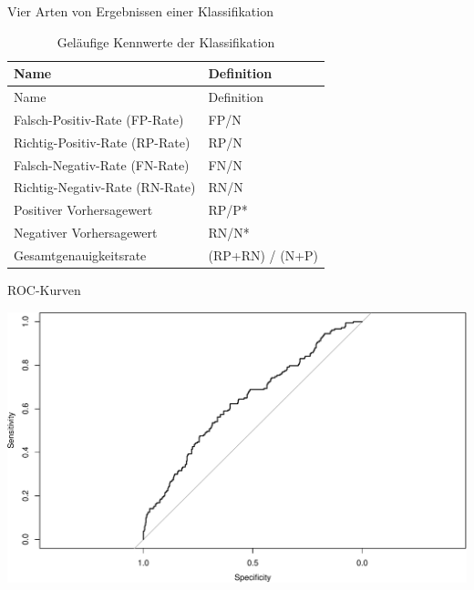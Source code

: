 \begin{frame}{Vier Arten von Ergebnissen einer Klassifikation}

\begin{longtable}[]{@{}ll@{}}
\caption{Geläufige Kennwerte der Klassifikation}\tabularnewline
\toprule
Name & Definition\tabularnewline
\midrule
\endfirsthead
\toprule
Name & Definition\tabularnewline
\midrule
\endhead
Falsch-Positiv-Rate (FP-Rate) & FP/N\tabularnewline
Richtig-Positiv-Rate (RP-Rate) & RP/N\tabularnewline
Falsch-Negativ-Rate (FN-Rate) & FN/N\tabularnewline
Richtig-Negativ-Rate (RN-Rate) & RN/N\tabularnewline
Positiver Vorhersagewert & RP/P*\tabularnewline
Negativer Vorhersagewert & RN/N*\tabularnewline
Gesamtgenauigkeitsrate & (RP+RN) / (N+P)\tabularnewline
\bottomrule
\end{longtable}

\end{frame}

\begin{frame}[fragile]{ROC-Kurven}

\begin{Shaded}
\begin{Highlighting}[]
\StringTok{ }\OperatorTok{$}\OperatorTok{$}
\end{Highlighting}
\end{Shaded}

\begin{center}\includegraphics[width=0.8\linewidth]{PraDa_Folien_nm_2_files/figure-beamer/unnamed-chunk-22-1} \end{center}

\end{frame}

